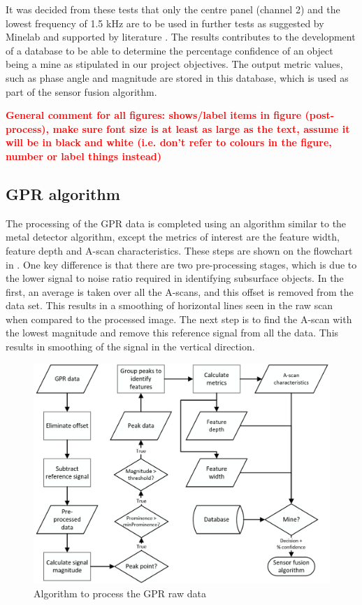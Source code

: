 \documentclass[main.tex]{subfiles}
\begin{document}
It was decided from these tests that only the centre panel (channel 2) and the lowest frequency of 1.5 kHz are to be used in further tests as suggested by Minelab and supported by literature \parencite{bruschini02}. The results contributes to the development of a database to be able to determine the percentage confidence of an object being a mine as stipulated in our project objectives. The output metric values, such as phase angle and magnitude are stored in this database, which is used as part of the sensor fusion algorithm. 

\textcolor{red}{\textbf{General comment for all figures: shows/label items in figure (post-process), make sure font size is at least as large as the text, assume it will be in black and white (i.e. don't refer to colours in the figure, number or label things instead)}}

\subsection{GPR algorithm}
The processing of the GPR data is completed using an algorithm similar to the metal detector algorithm, except the metrics of interest are the feature width, feature depth and A-scan characteristics. These steps are shown on the flowchart in . One key difference is that there are two pre-processing stages, which is due to the lower signal to noise ratio required in identifying subsurface objects.  In the first, an average is taken over all the A-scans, and this offset is removed from the data set. This results in a smoothing of horizontal lines seen in the raw scan when compared to the processed image. The next step is to find the A-scan with the lowest magnitude and remove this reference signal from all the data. This results in smoothing of the signal in the vertical direction.

\begin{figure}[ht]
\includegraphics[width=\textwidth]{4-DetailedDesign/GPRflow.PNG}
\centering
\caption{Algorithm to process the GPR raw data}
\end{figure}
\end{document}
